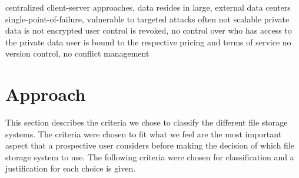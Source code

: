     centralized client-server approaches, data resides in large, external data centers
    single-point-of-failure, vulnerable to targeted attacks
    often not scalable
    private data is not encrypted
    user control is revoked, no control over who has access to the private data
    user is bound to the respective pricing and terms of service
    no version control, no conflict management

\section{Approach} %
\label{sec:approach}
This section describes the criteria we chose to classify the different file storage systems. The criteria were chosen to fit what we feel are the most important aspect that a prospective user considers before making the decision of which file storage system to use. The following criteria were chosen for classification and a justification for each choice is given.

